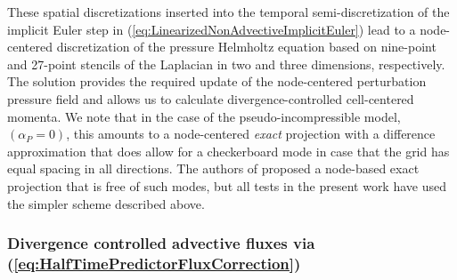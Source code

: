 \documentclass[12pt,a4paper]{article}
\theoremstyle{definition}
\newcommand{\eq}[1]{(\ref{#1})}
\newcommand{\apsinc}{\alpha_{P}}
\begin{document}
These spatial discretizations inserted into the temporal semi-discretization
of the implicit Euler step in \eq{eq:LinearizedNonAdvectiveImplicitEuler}
lead to a node-centered discretization of the pressure Helmholtz 
equation based on nine-point and 27-point stencils of the Laplacian in two 
and three dimensions, respectively. The solution provides the required update 
of the node-centered perturbation pressure field and allows us to 
calculate divergence-controlled cell-centered momenta. We note that in the case of the
pseudo-incompressible model, $(\apsinc = 0)$, this amounts to a node-centered 
\emph{exact} projection with a difference approximation that does allow for a 
checkerboard mode in case that the grid has equal spacing in all directions. The authors of \cite{VaterKlein2009} proposed a node-based exact projection that is free of
such modes, but all tests in the present work have used the simpler scheme 
described above.


\subsubsection{Divergence controlled advective fluxes via 
\eq{eq:HalfTimePredictorFluxCorrection}}
\label{sssec:DivControlledAdvectiveFluxes}
\end{document}
